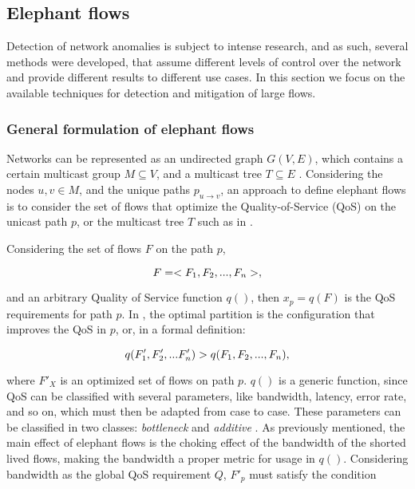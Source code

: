 \subsection {Elephant flows} \label{sec:el_fl}

Detection of network anomalies is subject to intense research, and as such, several methods were developed, that assume different levels of control over the network 
and provide different results to different use cases. In this section we focus on the available techniques for detection and mitigation of large flows.

\subsubsection{General formulation of elephant flows}

Networks can be represented as an undirected graph $G(V, E)$, which contains a certain multicast group $M \subseteq V$, and a multicast tree $T \subseteq E$ 
\cite{lorenz_optimal_2003}. Considering the nodes $u, v \in M$, and the unique paths $p_{u \to v}$, an approach to define elephant flows
is to consider the set of flows that optimize the Quality-of-Service (QoS) on the unicast path $p$, or the multicast tree $T$ such as in 
\cite{lorenz_optimal_2003, lorenz_optimal_2002}. 

\par Considering the set of flows $F$ on the path $p$,

\begin{equation*}
    \centering
    F = <F_1, F_2, ..., F_n>,
\end{equation*}

\par and an arbitrary Quality of Service function $q()$, then $x_p = q(F)$ is the QoS requirements for path $p$. In \cite{ros-giralt_mathematical_2017},
the optimal partition is the configuration that improves the QoS in $p$, or, in a formal definition:

\begin{equation*}
    \centering
    q(F'_1, F'_2, ... F'_n) > q(F_1, F_2, ..., F_n),
\end{equation*}

\par where $F'_{X}$ is an optimized set of flows on path $p$. $q()$ is a generic function, since QoS can be classified with several parameters, like bandwidth, 
latency, error rate, and so on, which must then be adapted from case to case. These parameters can be classified in two classes: \textit{bottleneck} and 
\textit{additive} \cite{lorenz_optimal_2003}. As previously mentioned, the main effect of elephant flows is the choking effect of the bandwidth of the shorted lived 
flows, making the bandwidth a proper metric for usage in $q()$. Considering bandwidth as the global QoS requirement $Q$, $F'_p$ must satisfy the condition

